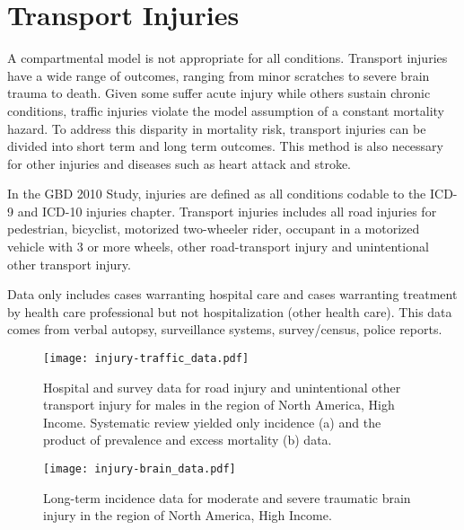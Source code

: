 \chapter{Transport Injuries}
\label{applications-double_dismod}

A compartmental model is not appropriate for all conditions.  Transport injuries have a wide range of outcomes, ranging from minor scratches to severe brain trauma to death.  Given some suffer acute injury while others sustain chronic conditions, traffic injuries violate the model assumption of a constant mortality hazard.  To address this disparity in mortality risk, transport injuries can be divided into short term and long term outcomes.  This method is also necessary for other injuries and diseases such as heart attack and stroke.

In the GBD 2010 Study, injuries are defined as all conditions codable to the ICD-9 and ICD-10 injuries chapter.  Transport injuries includes all road injuries for pedestrian, bicyclist, motorized two-wheeler rider, occupant in a motorized vehicle with 3 or more wheels, other road-transport injury and unintentional other transport injury.

Data only includes cases warranting hospital care and cases warranting treatment by health care professional but not hospitalization (other health care).  This data comes from verbal autopsy, surveillance systems, survey/census, police reports.

    \begin{figure}[h]
        \begin{center}
            \texttt{[image: injury-traffic\_data.pdf]}
            \caption{Hospital and survey data for road injury and unintentional other transport injury for males in the region of North America, High Income.  Systematic review yielded only incidence (a) and the product of prevalence and excess mortality (b) data.}
            \label{fig:app-injury traffic data}
        \end{center}
    \end{figure}

    \begin{figure}[h]
        \begin{center}
            \texttt{[image: injury-brain\_data.pdf]}
            \caption{Long-term incidence data for moderate and severe traumatic brain injury in the region of North America, High Income.}
            \label{fig:app-injury brain data}
        \end{center}
    \end{figure}

